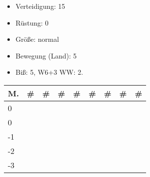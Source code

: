 \documentclass{article}
\begin{document}
\begin{itemize}
\item Verteidigung: 15
\item Rüstung:      0
\item Größe: normal
\item Bewegung (Land): 5
\item Biß: 5, W6+3 WW: 2.
\end{itemize}


\begin{small}
\begin{tabular}{|m{6mm}|m{3mm}|m{3mm}|m{3mm}|m{3mm}|m{3mm}|m{3mm}|m{3mm}|m{3mm}|}
\hline
\textbf{M.}&\textbf{\#}&\textbf{\#}&\textbf{\#}&\textbf{\#}&\textbf{\#}&\textbf{\#}&\textbf{\#}&\textbf{\#}\\
\hline
\hline
0& & & & & & & & \\
\hline
0& & & & & & & & \\
\hline
-1& & & & & & & & \\
\hline
-2& & & & & & & & \\
\hline
-3& & & & & & & & \\
\hline
\end{tabular}
\end{small}
\end{document}
